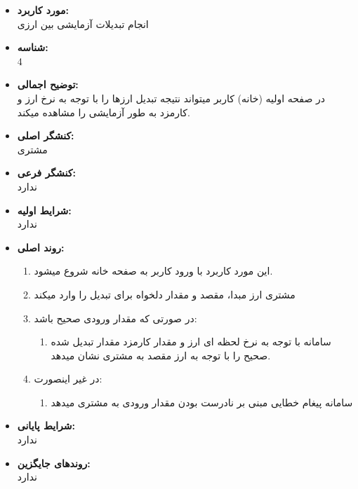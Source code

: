 \documentclass{article}
\begin{document}
\noindent\makebox[\linewidth]{\rule{\paperwidth}{0.4pt}}
\begin{itemize}
\item \textbf{مورد کاربرد:}\\
انجام تبدیلات آزمایشی بین ارزی 
\item \textbf{شناسه:}\\
4
\item \textbf{توضیح اجمالی:}\\
در صفحه اولیه (خانه) کاربر میتواند نتیجه تبدیل ارزها را با توجه به نرخ ارز و کارمزد به طور آزمایشی را مشاهده میکند. 
\item \textbf{کنشگر اصلی:}\\
مشتری
\item \textbf{کنشگر فرعی:}\\
ندارد
\item \textbf{شرایط اولیه:}\\
ندارد
\item \textbf{روند اصلی:}\\
\begin{enumerate}
\item این مورد کاربرد با ورود کاربر به صفحه خانه شروع میشود.
\item مشتری ارز مبدا، مقصد و مقدار دلخواه برای تبدیل را وارد میکند
\item در صورتی که مقدار ورودی صحیح باشد:
\begin{enumerate}
\item سامانه با توجه به نرخ لحظه ای ارز و مقدار کارمزد مقدار تبدیل شده صحیح را با توجه به ارز مقصد به مشتری نشان میدهد.  
\end{enumerate}
\item در غیر اینصورت:
\begin{enumerate}
\item سامانه پیغام خطایی مبنی بر نادرست بودن مقدار ورودی به مشتری میدهد
\end{enumerate}
\end{enumerate}
\item \textbf{شرایط پایانی:}\\ 
ندارد
\item \textbf{روندهای جایگزین:}\\
ندارد
\end{itemize}
\end{document}
